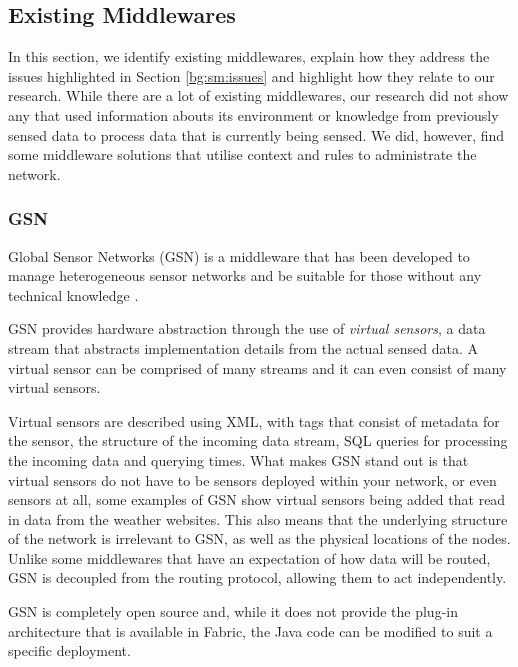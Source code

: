 \subsection{Existing Middlewares}\label{sec:middleware}
	In this section, we identify existing middlewares, explain how they address the issues highlighted in Section \ref{bg:sm:issues} and highlight how they relate to our research. While there are a lot of existing middlewares, our research did not show any that used information abouts its environment or knowledge from previously sensed data to process data that is currently being sensed. We did, however, find some middleware solutions that utilise context and rules to administrate the network.

	\subsubsection{GSN}\label{sec:GSN}
		Global Sensor Networks (GSN) is a middleware that has been developed to manage heterogeneous sensor networks and be suitable for those without any technical knowledge \cite{F2006}.

GSN provides hardware abstraction through the use of  \textit{virtual sensors}, a data stream that abstracts implementation details from the actual sensed data. A virtual sensor can be comprised of many streams and it can even consist of many virtual sensors. 

Virtual sensors are described using XML, with tags that consist of metadata for the sensor, the structure of the incoming data stream, SQL queries for processing the incoming data and querying times. What makes GSN stand out is that virtual sensors do not have to be sensors deployed within your network, or even sensors at all, some examples of GSN show virtual sensors being added that read in data from the weather websites. This also means that the underlying structure of the network is irrelevant to GSN, as well as the physical locations of the nodes. Unlike some middlewares that have an expectation of how data will be routed, GSN is decoupled from the routing protocol, allowing them to act independently.

GSN is completely open source and, while it does not provide the plug-in architecture that is available in Fabric, the Java code can be modified to suit a specific deployment. 

